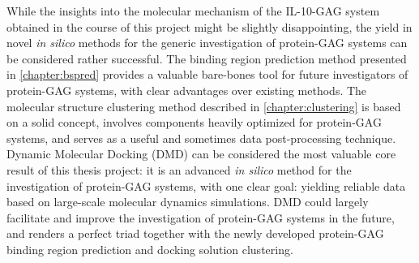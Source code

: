 While the insights into the molecular mechanism of the IL-10-GAG system obtained
in the course of this project might be slightly disappointing, the yield in
novel \textit{in silico} methods for the generic investigation of protein-GAG
systems can be considered rather successful. The binding region prediction
method presented in \cref{chapter:bspred} provides a valuable bare-bones tool
for future investigators of protein-GAG systems, with clear advantages over
existing methods. The molecular structure clustering method described in
\cref{chapter:clustering} is based on a solid concept, involves components
heavily optimized for protein-GAG systems, and serves as a useful and sometimes
 data post-processing technique. Dynamic Molecular Docking
(DMD) can be considered the most valuable core result of this thesis project: it
is an advanced \textit{in silico} method for the investigation of protein-GAG
systems, with one clear goal: yielding reliable data based on large-scale
molecular dynamics simulations. DMD could largely facilitate and improve the
investigation of protein-GAG systems in the future, and renders a perfect triad
together with the newly developed protein-GAG binding region prediction and
docking solution clustering.
